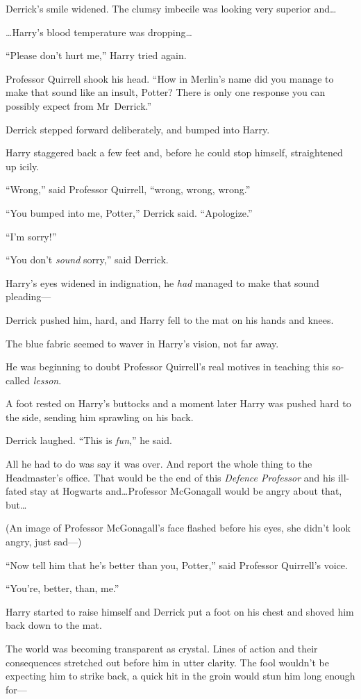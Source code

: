 Derrick’s smile widened. The clumsy imbecile was looking very superior and…

…Harry’s blood temperature was dropping…

“Please don’t hurt me,” Harry tried again.

Professor Quirrell shook his head. “How in Merlin’s name did you manage to make that sound like an insult, Potter? There is only one response you can possibly expect from Mr~Derrick.”

Derrick stepped forward deliberately, and bumped into Harry.

Harry staggered back a few feet and, before he could stop himself, straightened up icily.

“Wrong,” said Professor Quirrell, “wrong, wrong, wrong.”

“You bumped into me, Potter,” Derrick said. “Apologize.”

“I’m sorry!”

“You don’t \emph{sound} sorry,” said Derrick.

Harry’s eyes widened in indignation, he \emph{had} managed to make that sound pleading—

Derrick pushed him, hard, and Harry fell to the mat on his hands and knees.

The blue fabric seemed to waver in Harry’s vision, not far away.

He was beginning to doubt Professor Quirrell’s real motives in teaching this so-called \emph{lesson}.

A foot rested on Harry’s buttocks and a moment later Harry was pushed hard to the side, sending him sprawling on his back.

Derrick laughed. “This is \emph{fun},” he said.

All he had to do was say it was over. And report the whole thing to the Headmaster’s office. That would be the end of this \emph{Defence Professor} and his ill-fated stay at Hogwarts and…Professor McGonagall would be angry about that, but…

(An image of Professor McGonagall’s face flashed before his eyes, she didn’t look angry, just sad—)

“Now tell him that he’s better than you, Potter,” said Professor Quirrell’s voice.

“You’re, better, than, me.”

Harry started to raise himself and Derrick put a foot on his chest and shoved him back down to the mat.

The world was becoming transparent as crystal. Lines of action and their consequences stretched out before him in utter clarity. The fool wouldn’t be expecting him to strike back, a quick hit in the groin would stun him long enough for—

